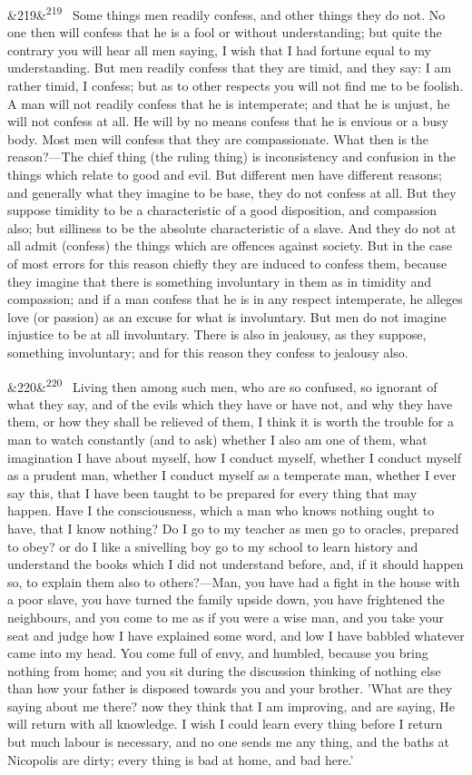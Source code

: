 \documentclass[12pt]{article}
\newcommand{\para}[1][]{\par\noindent\ifx&#1&\else\textsuperscript{\footnotesize #1}~\fi}
\begin{document}
\para[219] Some things men readily confess, and other things they do not. No one then will confess that he is a fool or without understanding; but quite the contrary you will hear all men saying, I wish that I had fortune equal to my understanding. But men readily confess that they are timid, and they say: I am rather timid, I confess; but as to other respects you will not find me to be foolish. A man will not readily confess that he is intemperate; and that he is unjust, he will not confess at all. He will by no means confess that he is envious or a busy body. Most men will confess that they are compassionate. What then is the reason?—The chief thing (the ruling thing) is inconsistency and confusion in the things which relate to good and evil. But different men have different reasons; and generally what they imagine to be base, they do not confess at all. But they suppose timidity to be a characteristic of a good disposition, and compassion also; but silliness to be the absolute characteristic of a slave. And they do not at all admit (confess) the things which are offences against society. But in the case of most errors for this reason chiefly they are induced to confess them, because they imagine that there is something involuntary in them as in timidity and compassion; and if a man confess that he is in any respect intemperate, he alleges love (or passion) as an excuse for what is involuntary. But men do not imagine injustice to be at all involuntary. There is also in jealousy, as they suppose, something involuntary; and for this reason they confess to jealousy also.

\para[220] Living then among such men, who are so confused, so ignorant of what they say, and of the evils which they have or have not, and why they have them, or how they shall be relieved of them, I think it is worth the trouble for a man to watch constantly (and to ask) whether I also am one of them, what imagination I have about myself, how I conduct myself, whether I conduct myself as a prudent man, whether I conduct myself as a temperate man, whether I ever say this, that I have been taught to be prepared for every thing that may happen. Have I the consciousness, which a man who knows nothing ought to have, that I know nothing? Do I go to my teacher as men go to oracles, prepared to obey? or do I like a snivelling boy go to my school to learn history and understand the books which I did not understand before, and, if it should happen so, to explain them also to others?—Man, you have had a fight in the house with a poor slave, you have turned the family upside down, you have frightened the neighbours, and you come to me as if you were a wise man, and you take your seat and judge how I have explained some word, and low I have babbled whatever came into my head. You come full of envy, and humbled, because you bring nothing from home; and you sit during the discussion thinking of nothing else than how your father is disposed towards you and your brother. 'What are they saying about me there? now they think that I am improving, and are saying, He will return with all knowledge. I wish I could learn every thing before I return but much labour is necessary, and no one sends me any thing, and the baths at Nicopolis are dirty; every thing is bad at home, and bad here.'
\end{document}
